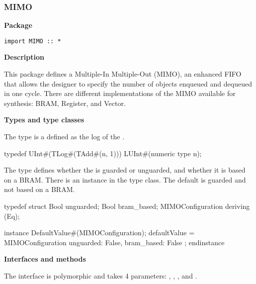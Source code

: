 \subsubsection{MIMO}


\label{MIMO}

{\bf Package}


\begin{verbatim}
import MIMO :: *
\end{verbatim}



{\bf Description} 

This package defines a Multiple-In Multiple-Out (MIMO), an enhanced
FIFO that allows the designer to specify the number  of objects enqueued and
dequeued in one cycle.  There are different implementations of the
MIMO available for synthesis: BRAM, Register, and Vector.


{\bf Types and type classes}

The  type is a  defined as the log of the .

\begin{libverbatim}
typedef UInt#(TLog#(TAdd#(n, 1)))     LUInt#(numeric type n);
\end{libverbatim}

The  type defines whether the  is
guarded or unguarded, and whether it is based on a BRAM.  There is an
instance in the  type class.  The default 
is guarded and not based on a BRAM.


\begin{libverbatim}
typedef struct {
   Bool         unguarded;
   Bool         bram_based;
} MIMOConfiguration deriving (Eq);
\end{libverbatim}



\begin{libverbatim}
instance DefaultValue#(MIMOConfiguration);
   defaultValue = MIMOConfiguration {
      unguarded:  False,
      bram_based: False
      };
endinstance
\end{libverbatim}



{\bf Interfaces and methods}

 The  interface 
 is polymorphic and takes 4 parameters: , ,
 , and .



